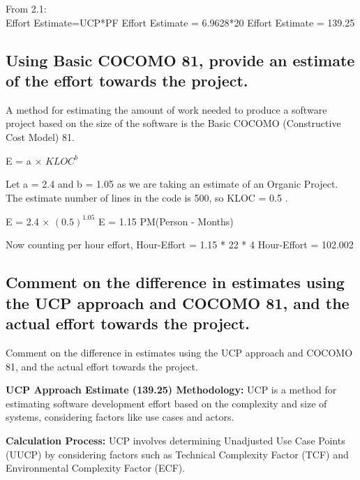 {{{\normalsize{From 2.1:\\}
\normalsize{Effort Estimate=UCP*PF\linebreak
Effort Estimate = 6.9628*20\linebreak
Effort Estimate = 139.25\linebreak}

\subsection{Using Basic COCOMO 81, provide an estimate of the effort towards the project.}

\normalsize{A method for estimating the amount of work needed to produce a software project based on the size of the software is the Basic COCOMO (Constructive Cost Model) 81.\linebreak}

\normalsize{E = a × $KLOC^{b}$\linebreak}

\normalsize{Let a = 2.4 and b = 1.05 as we are taking an estimate of an Organic Project. \linebreak
The estimate number of lines in the code is 500, so KLOC = 0.5 .\linebreak}

\normalsize{E = 2.4 × $(0.5)^{1.05}$ \linebreak
E = 1.15 PM(Person - Months)}

\normalsize{Now counting per hour effort,\linebreak
Hour-Effort = 1.15 * 22 * 4\linebreak
Hour-Effort = 102.002}


\subsection{Comment on the difference in estimates using the UCP approach and COCOMO 81, and the actual effort towards the project. 
}

\normalsize{Comment on the difference in estimates using the UCP approach and COCOMO 81, and the actual effort towards the project. \linebreak

\textbf{UCP Approach Estimate (139.25) Methodology:} UCP is a method for estimating software development effort based on the complexity and size of systems, considering factors like use cases and actors.\linebreak

\textbf{Calculation Process:} UCP involves determining Unadjusted Use Case Points (UUCP) by considering factors such as Technical Complexity Factor (TCF) and Environmental Complexity Factor (ECF).\linebreak

}}}}
